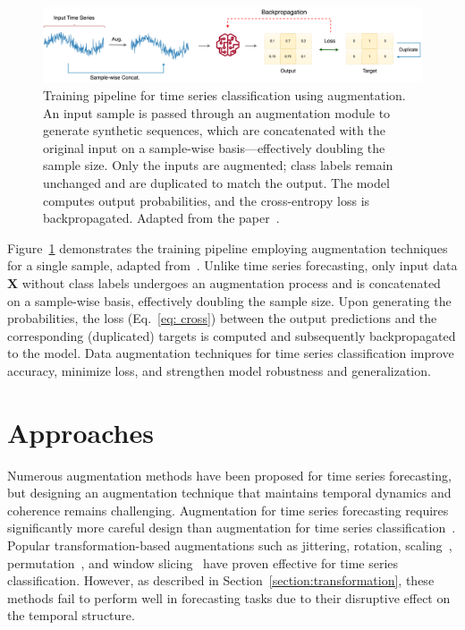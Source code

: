 \begin{figure}[h!]
    \centering
\includegraphics[width=1.0\textwidth, height=1.0\textheight, keepaspectratio]{./images/tsc_framework.drawio.png}

\caption{Training pipeline for time series classification using augmentation. An input sample is passed through an augmentation module to generate synthetic sequences, which are concatenated with the original input on a sample-wise basis—effectively doubling the sample size. Only the inputs are augmented; class labels remain unchanged and are duplicated to match the output. The model computes output probabilities, and the cross-entropy loss is backpropagated. Adapted from the paper~\cite{chen2023fraugfrequencydomainaugmentation}.}

    \label{fig:tsc_fw}
\end{figure}



Figure~\ref{fig:tsc_fw} demonstrates the training pipeline employing augmentation techniques for a single sample, adapted from~\cite{chen2023fraugfrequencydomainaugmentation}. Unlike time series forecasting, only input data $\mathbf{X}$ without class labels undergoes an augmentation process and is concatenated on a sample-wise basis, effectively doubling the sample size. Upon generating the probabilities, the loss (Eq.~\ref{eq: cross}) between the output predictions and the corresponding (duplicated) targets is computed and subsequently backpropagated to the model. Data augmentation techniques for time series classification improve accuracy, minimize loss, and strengthen model robustness and generalization.
 



\section{Approaches} \label{sec: approaches}


Numerous augmentation methods have been proposed for time series forecasting, but designing an augmentation technique that maintains temporal dynamics and coherence remains challenging. Augmentation for time series forecasting requires significantly more careful design than augmentation for time series classification~\cite{zhang2023diversecoherentaugmentationtimeseries}. Popular transformation-based augmentations such as jittering, rotation, scaling~\cite{Um_2017}, permutation~\cite{Pan2020}, and window slicing~\cite{leguennec:halshs-01357973} have proven effective for time series classification. However, as described in Section~\ref{section:transformation}, these methods fail to perform well in forecasting tasks due to their disruptive effect on the temporal structure.

